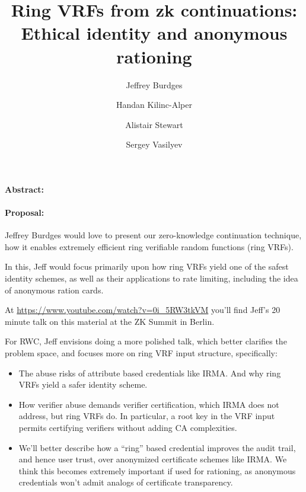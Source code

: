 \documentclass{article}
\title{Ring VRFs from zk continuations: \\ Ethical identity and anonymous rationing}
\author{Jeffrey Burdges \and Handan Kilinc-Alper \and Alistair Stewart \and Sergey Vasilyev}
\date{}
\begin{document}
\maketitle


\paragraph{Abstract:} \quad 



\paragraph{Proposal:} \quad

Jeffrey Burdges would love to present our zero-knowledge continuation
technique, how it enables extremely efficient ring verifiable
random functions (ring VRFs).

In this, Jeff would focus primarily upon how ring VRFs yield one of the
safest identity schemes, as well as their applications to rate limiting,
including the idea of anonymous ration cards.

\smallskip

At \quad \url{https://www.youtube.com/watch?v=0i_5RW3tkVM} \quad you'll
find Jeff's 20 minute talk on this material at the
ZK Summit in Berlin.

\smallskip

For RWC, Jeff envisions doing a more polished talk, which better clarifies
the problem space, and focuses more on ring VRF input structure,
specifically:
\begin{itemize}
\item The abuse risks of attribute based credentials like IRMA.
 And why ring VRFs yield a safer identity scheme.
\item How verifier abuse demands verifier certification, which IRMA does
 not address, but ring VRFs do.  In particular, a root key in the VRF input
 permits certifying verifiers without adding CA complexities.
\item We'll better describe how a ``ring'' based credential improves
 the audit trail, and hence user trust, over anonymized certificate schemes
 like IRMA.  We think this becomes extremely important if used for rationing,
 as anonymous credentials won't admit analogs of certificate transparency.
\end{itemize}
\end{document}

